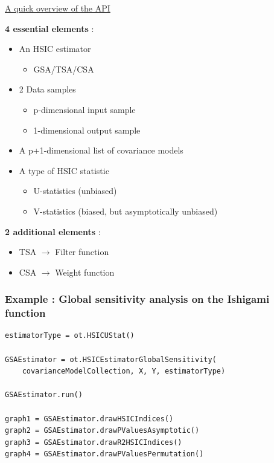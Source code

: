 \documentclass{beamer}
\begin{document}
\begin{frame}
\begin{small}

\underline{A quick overview of the API}

\begin{minipage}[t]{0.6\textwidth}

\vspace{6pt}

\textbf{4 essential elements} : 
\begin{itemize}
\item An HSIC estimator
\begin{itemize}
\item GSA/TSA/CSA
\end{itemize}
\item 2 Data samples
\begin{itemize}
\item p-dimensional input sample
\item 1-dimensional output sample
\end{itemize}
\item A p+1-dimensional list of covariance models
\item A type of HSIC statistic
\begin{itemize}
\item U-statistics (unbiased)
\item V-statistics (biased, but asymptotically unbiased)
\end{itemize}
\end{itemize}
\end{minipage}%
\begin{minipage}[t]{0.4\textwidth}

\vspace{6pt}

\textbf{2 additional elements} : 
\begin{itemize}
\item TSA $\rightarrow$ Filter function
\item CSA $\rightarrow$ Weight function
\end{itemize}
\end{minipage}%


\end{small}
\end{frame}

\begin{frame}[containsverbatim]	
\frametitle{Example : Global sensitivity analysis on the Ishigami function}
\begin{small}

\begin{lstlisting}
estimatorType = ot.HSICUStat()

GSAEstimator = ot.HSICEstimatorGlobalSensitivity(
    covarianceModelCollection, X, Y, estimatorType)
    
GSAEstimator.run()

graph1 = GSAEstimator.drawHSICIndices()
graph2 = GSAEstimator.drawPValuesAsymptotic()
graph3 = GSAEstimator.drawR2HSICIndices()
graph4 = GSAEstimator.drawPValuesPermutation()
\end{lstlisting}

\end{small}
\end{frame}
\end{document}
